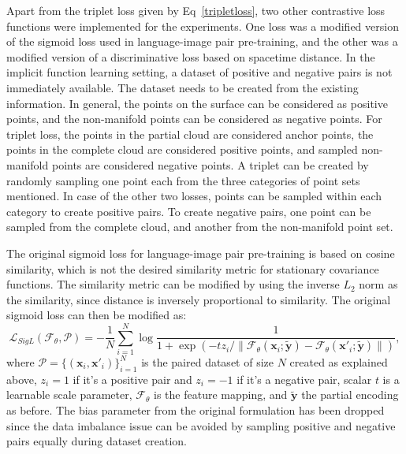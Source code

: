             Apart from the triplet loss given by Eq~\ref{tripletloss}, two other contrastive loss functions were implemented for the experiments. One loss was a modified version of the sigmoid loss used in language-image pair pre-training, and the other was a modified version of a discriminative loss based on spacetime distance. In the implicit function learning setting, a dataset of positive and negative pairs is not immediately available. The dataset needs to be created from the existing information. In general, the points on the surface can be considered as positive points, and the non-manifold points can be considered as negative points. For triplet loss, the points in the partial cloud are considered anchor points, the points in the complete cloud are considered positive points, and sampled non-manifold points are considered negative points. A triplet can be created by randomly sampling one point each from the three categories of point sets mentioned. In case of the other two losses, points can be sampled within each category to create positive pairs. To create negative pairs, one point can be sampled from the complete cloud, and another from the non-manifold point set.
            \newline

            The original sigmoid loss for language-image pair pre-training is based on cosine similarity, which is not the desired similarity metric for stationary covariance functions. The similarity metric can be modified by using the inverse $L_2$ norm as the similarity, since distance is inversely proportional to similarity. The original sigmoid loss can then be modified as:
            \begin{equation}\label{SigLipL2}
                \mathcal{L}_{SigL}(\mathcal{F}_\theta, \mathcal{P}) = -\frac{1}{N}\sum_{i=1}^N \log \frac{1}{1+ \exp(-tz_i/\|\mathcal{F}_\theta(\mathbf{x}_i; \mathbf{\tilde{y}}) - \mathcal{F}_\theta(\mathbf{x'}_i; \mathbf{\tilde{y}})\|)},
            \end{equation}
            where $\mathcal{P} = \{(\mathbf{x}_i, \mathbf{x'}_i)\}_{i=1}^N$ is the paired dataset of size $N$ created as explained above, $z_i=1$ if it's a positive pair and $z_i=-1$ if it's a negative pair, scalar $t$ is a learnable scale parameter, $\mathcal{F}_\theta$ is the feature mapping, and $\mathbf{\tilde{y}}$ the partial encoding as before. The bias parameter from the original formulation has been dropped since the data imbalance issue can be avoided by sampling positive and negative pairs equally during dataset creation.
            \newline
            
